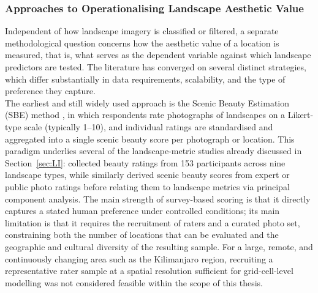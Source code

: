 \documentclass[hidelinks, 11pt]{article}
\begin{document}
\subsubsection{Approaches to Operationalising Landscape Aesthetic Value}\label{sec:ScoringOptions}

Independent of how landscape imagery is classified or filtered, a separate methodological question concerns how the aesthetic value of a location is measured, that is, what serves as the dependent variable against which landscape predictors are tested. The literature has converged on several distinct strategies, which differ substantially in data requirements, scalability, and the type of preference they capture.
\\
The earliest and still widely used approach is the Scenic Beauty Estimation (SBE) method \citep{daniel_boster_1976}, in which respondents rate photographs of landscapes on a Likert-type scale (typically 1--10), and individual ratings are standardised and aggregated into a single scenic beauty score per photograph or location. This paradigm underlies several of the landscape-metric studies already discussed in Section~\ref{sec:LI}: \citet{frank_assessment_2013} collected beauty ratings from 153 participants across nine landscape types, while \citet{schirpke_predicting_2013} similarly derived scenic beauty scores from expert or public photo ratings before relating them to landscape metrics via principal component analysis. The main strength of survey-based scoring is that it directly captures a stated human preference under controlled conditions; its main limitation is that it requires the recruitment of raters and a curated photo set, constraining both the number of locations that can be evaluated and the geographic and cultural diversity of the resulting sample. For a large, remote, and continuously changing area such as the Kilimanjaro region, recruiting a representative rater sample at a spatial resolution sufficient for grid-cell-level modelling was not considered feasible within the scope of this thesis.
\\
\end{document}
